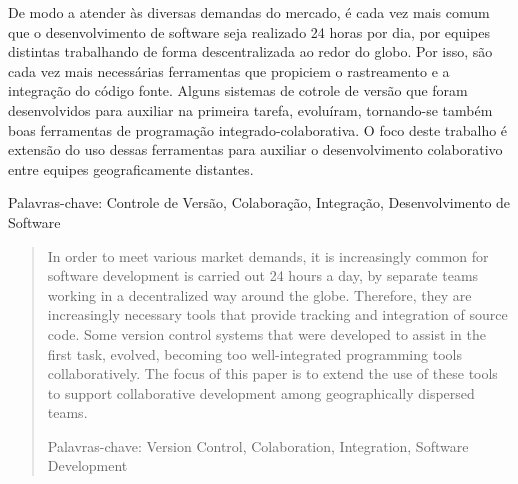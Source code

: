 \begin{resumo}
De modo a atender às diversas demandas do mercado, é cada vez mais comum que
o desenvolvimento de software seja realizado 24 horas por dia, por equipes
distintas trabalhando de forma descentralizada ao redor do globo. Por isso,
são cada vez mais necessárias ferramentas que propiciem o rastreamento e a
integração do código fonte. Alguns sistemas de cotrole de versão que foram
desenvolvidos para auxiliar na primeira tarefa, evoluíram, tornando-se também
boas ferramentas de programação integrado-colaborativa. O foco deste trabalho
é extensão do uso dessas ferramentas para auxiliar o desenvolvimento colaborativo
entre equipes geograficamente distantes.

Palavras-chave: Controle de Versão, Colaboração, Integração, Desenvolvimento de Software
\end{resumo}

\begin{abstract}
In order to meet various market demands, it is increasingly common for software
development is carried out 24 hours a day, by separate teams working in a
decentralized way around the globe. Therefore, they are increasingly necessary
tools that provide tracking and integration of source code. Some version control
systems that were developed to assist in the first task, evolved, becoming too
well-integrated programming tools collaboratively. The focus of this paper is
to extend the use of these tools to support collaborative development among
geographically dispersed teams.

Palavras-chave: Version Control, Colaboration, Integration, Software Development
\end{abstract}